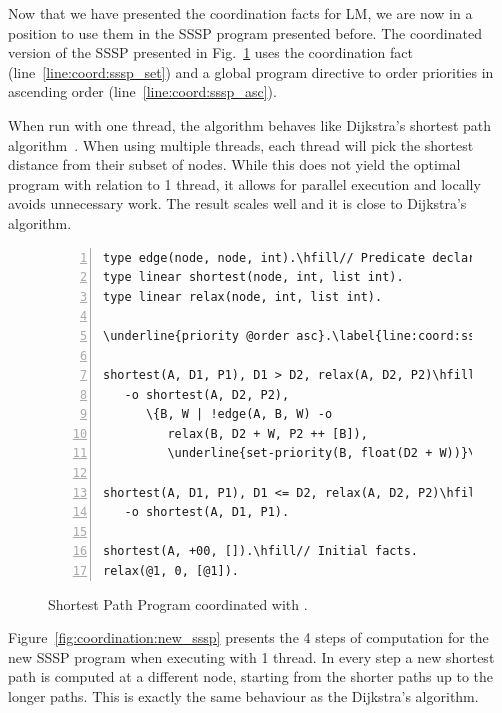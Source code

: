Now that we have presented the coordination facts for LM, we are now in a
position to use them in the SSSP program presented before.  The coordinated
version of the SSSP presented in Fig.~\ref{code:shortest_path_program_coord}
uses the coordination fact  (line~\ref{line:coord:sssp_set})
and a global program directive to order priorities in ascending order
(line~\ref{line:coord:sssp_asc}).

When run with one thread, the algorithm behaves like Dijkstra's shortest path
algorithm~\cite{Dijkstra}. When using multiple threads, each thread will pick
the shortest distance from their subset of nodes. While this does not yield the
optimal program with relation to 1 thread, it allows for parallel execution and
locally avoids unnecessary work. The result scales well and it is close to
Dijkstra's algorithm.

\begin{figure}[ht]
\begin{Verbatim}[numbers=left,commandchars=\\\{\},fontsize=\scriptsize]
type edge(node, node, int).\hfill// Predicate declaration.
type linear shortest(node, int, list int).
type linear relax(node, int, list int).

\underline{priority @order asc}.\label{line:coord:sssp_asc}

shortest(A, D1, P1), D1 > D2, relax(A, D2, P2)\hfill// Rule 1: newly improved path.
   -o shortest(A, D2, P2),
      \{B, W | !edge(A, B, W) -o
         relax(B, D2 + W, P2 ++ [B]),
         \underline{set-priority(B, float(D2 + W))}\}.\label{line:coord:sssp_set}

shortest(A, D1, P1), D1 <= D2, relax(A, D2, P2)\hfill// Rule 2: longer path.
   -o shortest(A, D1, P1).

shortest(A, +00, []).\hfill// Initial facts.
relax(@1, 0, [@1]).
\end{Verbatim}
   \caption{Shortest Path Program coordinated with .}
   \label{code:shortest_path_program_coord}
\end{figure}

Figure~\ref{fig:coordination:new_sssp} presents the 4 steps of computation for
the new SSSP program when executing with 1 thread. In every step a new shortest
path is computed at a different node, starting from the shorter paths up to
the longer paths. This is exactly the same behaviour as the Dijkstra's
algorithm.

